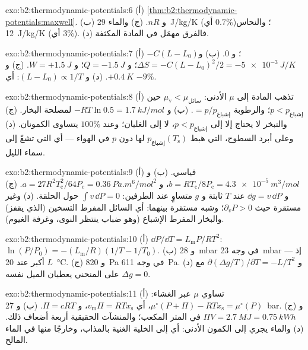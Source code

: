 \begin{solution}{exo:b2:thermodynamic-potentials:6}
(أ) \cref{thm:b2:thermodynamic-potentials:maxwell}. (ب) و $nR$. (ج) والماء
\qty{29}{J/kg/K} (أي $0.7\%$)؛ والنحاس \qty{12}{J/kg/K} (أي $3\%$). (د) فالفرق
مهمَل في المادة المكثفة.
\end{solution}

\begin{solution}{exo:b2:thermodynamic-potentials:7}
(أ) $-C(L - L_0)$؛ و $0$. (ب) و $\Delta S = -C(L - L_0)^2/2 = \qty{-5e-3}{J/K}$؛ و $Q =
\qty{-1.5}{J}$؛ و $W = +\qty{1.5}{J}$. (ج) و $+\qty{0.4}{K}$. (د) و $(L - L_0) \propto
1/T$: أي $-9\%$.
\end{solution}

\begin{solution}{exo:b2:thermodynamic-potentials:8}
(أ) تذهب المادة إلى $\mu$ الأدنى: $\mu_{\text{v}} < \mu_{\text{سائل}}$ حين $p <
p_{\text{إشباع}}$؛ والرطوبة $= p/p_{\text{إشباع}}$. (ب) و $-RT\ln 0.5 = \qty{1.7}{kJ/mol}$
لمصلحة البخار. (ج) والتبخر لا يحتاج إلا إلى $p < p_{\text{إشباع}}$،
لا إلى الغليان؛ وعند $100\%$ يتساوى الكمونان. (د) وعلى أبرد
السطوح، التي هبط $p_{\text{إشباع}}(T_{\text{s}})$ لها دون $p$ في الهواء
--- أي التي تشعّ إلى سماء الليل.
\end{solution}

\begin{solution}{exo:b2:thermodynamic-potentials:9}
(أ) قياسي. (ب) و $b = RT_{\text{c}}/8P_{\text{c}} = \qty{4.3e-5}{m^3/mol}$، و $a =
27R^2T_{\text{c}}^2/64P_{\text{c}} = \qty{0.36}{Pa.m^6/mol^2}$. (ج) و $\dd g = v\,\dd P$
عند $T$ ثابتة و $g$ متساوٍ عند الطرفين: $\int v\,\dd P = 0$ حول
الحلقة. (د) وغير مستقرة حيث $\partial_vP > 0$؛ وشبه مستقرة بينهما: أي
السائل المفرط التسخين (الذي يقفز) والبخار المفرط الإشباع (وهو ضباب
ينتظر النوى، وغرفة الغيوم).
\end{solution}

\begin{solution}{exo:b2:thermodynamic-potentials:10}
(أ) $\dd P/\dd T = L_{\text{m}}P/RT^2$: $\ln(P/P_0) = -(L_{\text{m}}/R)(1/T - 1/T_0)$.
(ب) و \qty{28}{mbar} في وجه \qty{23}{mbar} --- إذ $L$ أكبر عند \qty{20}{\celsius}.
(ج) و \qty{820}{Pa} في وجه \qty{611}{Pa}. (د) و $\partial(\Delta g/T)/\partial T = -L/T^2$
مع $\Delta g = 0$ على المنحني يعطيان الميل نفسه.
\end{solution}

\begin{solution}{exo:b2:thermodynamic-potentials:11}
(أ) تساوي $\mu$ عبر الغشاء: $\mu^\circ(P + \Pi) - RTx_{\text{s}} =
\mu^\circ(P)$، أي $v_{\text{m}}\Pi = RTx_{\text{s}}$، و $\Pi = cRT$. (ب) و \qty{27}{bar}.
(ج) و $\Pi V = \qty{2.7}{MJ} = \qty{0.75}{kWh}$ في المتر المكعب؛ والمنشآت الحقيقية
أربعة أضعاف ذلك. (د) والماء يجري إلى الكمون الأدنى: أي إلى
الخلية الغنية بالمذاب، وخارجًا منها في الماء المالح.
\end{solution}

